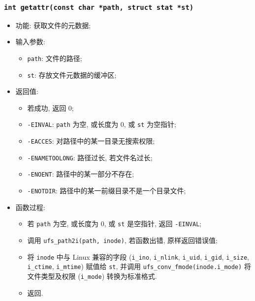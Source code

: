 \documentclass[nofonts]{ctexart}
\begin{document}
  \subsubsection{\texttt{int getattr(const char *path, struct stat *st)}}
  \begin{itemize}
\item
  功能: 获取文件的元数据;
\item
  输入参数:

  \begin{itemize}
  \item
    \texttt{path}: 文件的路径;
  \item
    \texttt{st}: 存放文件元数据的缓冲区;
  \end{itemize}
\item
  返回值:

  \begin{itemize}
  \item
    若成功, 返回 0;
  \item
    \texttt{-EINVAL}: \texttt{path} 为空, 或长度为 0, 或 \texttt{st}
    为空指针;
  \item
    \texttt{-EACCES}: 对路径中的某一目录无搜索权限;
  \item
    \texttt{-ENAMETOOLONG}: 路径过长, 若文件名过长;
  \item
    \texttt{-ENOENT}: 路径中的某一部分不存在;
  \item
    \texttt{-ENOTDIR}: 路径中的某一前缀目录不是一个目录文件;
  \end{itemize}
\item
  函数过程:

  \begin{itemize}
  \item
    若 \texttt{path} 为空, 或长度为 0, 或 \texttt{st} 是空指针, 返回
    \texttt{-EINVAL};
  \item
    调用 \texttt{ufs\_path2i(path, inode)}, 若函数出错, 原样返回错误值;
  \item
    将 \texttt{inode} 中与 Linux 兼容的字段 (\texttt{i\_ino},
    \texttt{i\_nlink}, \texttt{i\_uid}, \texttt{i\_gid},
    \texttt{i\_size}, \texttt{i\_ctime}, \texttt{i\_mtime}) 赋值给
    \texttt{st}, 并调用 \texttt{ufs\_conv\_fmode(inode.i\_mode)} 将
    文件类型及权限 (\texttt{i\_mode}) 转换为标准格式.
  \item
    返回.
  \end{itemize}
  \end{itemize}
\end{document}
